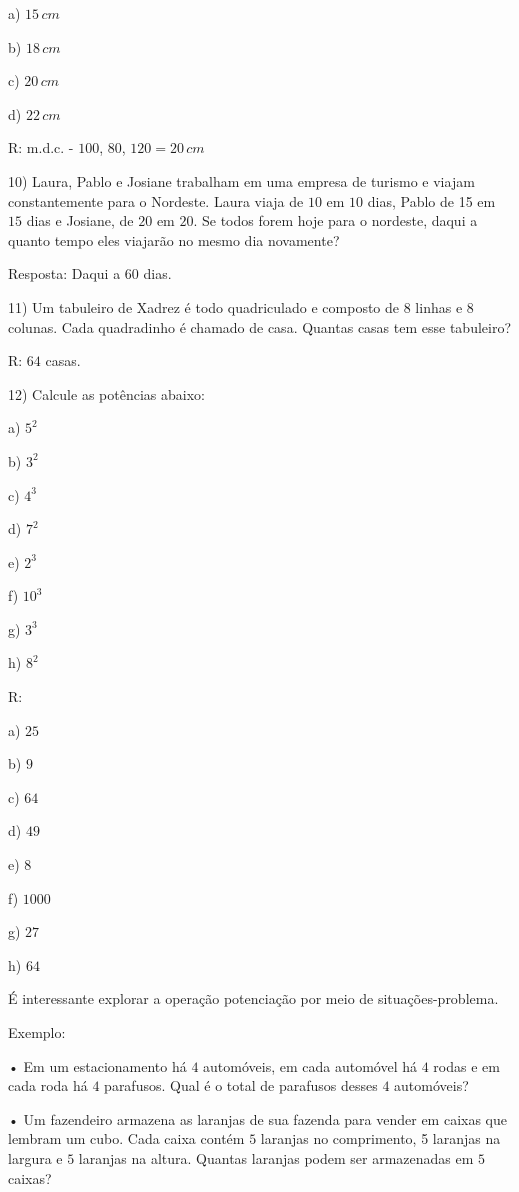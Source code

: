 a) $15\,cm$

b) $18\,cm$

c) $20\,cm$

d) $22\,cm$

R: m.d.c. - $100$, $80$, $120 = 20\,cm$

10) Laura, Pablo e Josiane trabalham em uma empresa de turismo e viajam
constantemente para o Nordeste. Laura viaja de $10$ em $10$ dias, Pablo de
15 em $15$ dias e Josiane, de $20$ em $20$. Se todos forem hoje para o
nordeste, daqui a quanto tempo eles viajarão no mesmo dia novamente?

Resposta: Daqui a $60$ dias.

11) Um tabuleiro de Xadrez é todo quadriculado e composto de $8$ linhas e
8 colunas. Cada quadradinho é chamado de casa. Quantas casas tem esse
tabuleiro?


R: $64$ casas.

12) Calcule as potências abaixo:

a) $5^2$

b) $3^2$

c) $4^3$

d) $7^2$

e) $2^3$

f) $10^3$

g) $3^3$

h) $8^2$

R:

a) $25$

b) $9$

c) $64$

d) $49$

e) $8$

f) $1000$

g) $27$

h) $64$

É interessante explorar a operação potenciação por meio de
situações-problema.

Exemplo:

• Em um estacionamento há $4$ automóveis, em cada automóvel há $4$ rodas e
em cada roda há $4$ parafusos. Qual é o total de parafusos desses $4$
automóveis?

• Um fazendeiro armazena as laranjas de sua fazenda para vender em
caixas que lembram um cubo. Cada caixa contém $5$ laranjas no comprimento,
5 laranjas na largura e $5$ laranjas na altura. Quantas laranjas podem ser
armazenadas em $5$ caixas?

